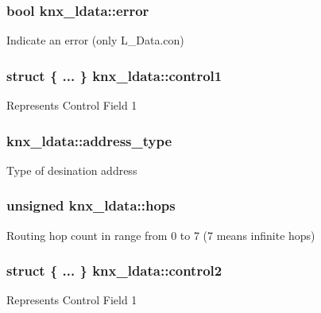 \subsubsection[{\texorpdfstring{error}{error}}]{\setlength{\rightskip}{0pt plus 5cm}bool knx\+\_\+ldata\+::error}\hypertarget{structknx__ldata_a9975ca659781a65fa468299c553040d1}{}\label{structknx__ldata_a9975ca659781a65fa468299c553040d1}
Indicate an error (only L\+\_\+\+Data.\+con) 
\subsubsection[{\texorpdfstring{control1}{control1}}]{\setlength{\rightskip}{0pt plus 5cm}struct \{ ... \}   knx\+\_\+ldata\+::control1}\hypertarget{structknx__ldata_a9e42111fdc076358ad027879c80e9151}{}\label{structknx__ldata_a9e42111fdc076358ad027879c80e9151}
Represents Control Field 1 
\subsubsection[{\texorpdfstring{address\+\_\+type}{address_type}}]{ knx\+\_\+ldata\+::address\+\_\+type}\hypertarget{structknx__ldata_aa2e94b1374d52a1734c74f8cf692bb11}{}\label{structknx__ldata_aa2e94b1374d52a1734c74f8cf692bb11}
Type of {\ttfamily desination} address 
\subsubsection[{\texorpdfstring{hops}{hops}}]{\setlength{\rightskip}{0pt plus 5cm}unsigned knx\+\_\+ldata\+::hops}\hypertarget{structknx__ldata_ad18b3beef28a5ea401b8a9ef766ad258}{}\label{structknx__ldata_ad18b3beef28a5ea401b8a9ef766ad258}
Routing hop count in range from 0 to 7 (7 means infinite hops) 
\subsubsection[{\texorpdfstring{control2}{control2}}]{\setlength{\rightskip}{0pt plus 5cm}struct \{ ... \}   knx\+\_\+ldata\+::control2}\hypertarget{structknx__ldata_a34dfef899ceff0e56c9b6775b0208442}{}\label{structknx__ldata_a34dfef899ceff0e56c9b6775b0208442}
Represents Control Field 1 
